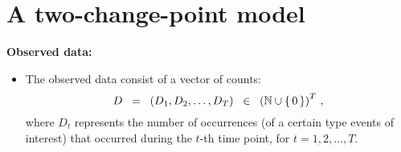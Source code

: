 

\section{A two-change-point model}
\setcounter{theorem}{0}
\setcounter{equation}{0}


\renewcommand{\theenumi}{\roman{enumi}}
\renewcommand{\labelenumi}{\textnormal{(\theenumi)}$\;\;$}


\vskip 0.5cm
\noindent
\textbf{Observed data:}
\begin{itemize}
\item
	The observed data consist of a vector of counts:
	\begin{equation*}
	D \;\; = \;\; (D_{1}, D_{2}, \ldots , D_{T}) \;\; \in \;\; \left(\mathbb{N}\cup\{\,0\,\}\right)^{T}\,,
	\end{equation*}
	where
	$D_{t}$ represents the number of occurrences (of a certain type events of interest)
	that occurred during the $t$-th time point, for $t = 1, 2, \ldots, T$.
\end{itemize}


